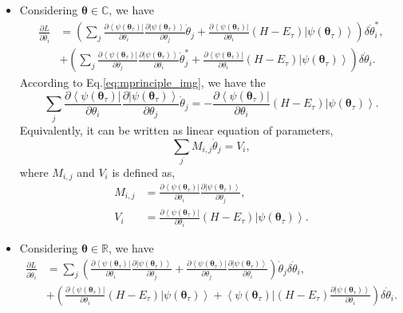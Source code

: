 \documentclass[twocolumn,
pra,aps,superscriptaddress,showpacs,amsmath,amssymb]{revtex4-2}
\begin{document}
\begin{itemize}
\item Considering $\bm{\theta}\in \mathbb{C}$, we have
\begin{align}
\frac{\partial{L}}{\partial\dot{\theta}_i}& =\left(\sum_j\frac{\partial\left<\psi(\bm{\theta}_\tau)\right|}{\partial\theta_i}\frac{\partial\left|\psi(\bm{\theta}_\tau)\right>}{\partial\theta_j}\dot{\theta}_j+\frac{\partial\left<\psi(\bm{\theta}_\tau)\right|}{\partial\theta_i}(H - E_\tau)\left|\psi(\bm{\theta}_\tau)\right>\right)\delta\dot{\theta}_i^*,  \\
&+\left(\sum_j\frac{\partial\left<\psi(\bm{\theta}_\tau)\right|}{\partial\theta_j}\frac{\partial\left|\psi(\bm{\theta}_\tau)\right>}{\partial\theta_i}\dot{\theta}_j^*+\frac{\partial\left<\psi(\bm{\theta}_\tau)\right|}{\partial\theta_i}(H - E_\tau)\left|\psi(\bm{\theta}_\tau)\right>\right)\delta\dot{\theta}_i.
\end{align}
According to Eq.\eqref{eq:mprinciple_img}, we have the 
\begin{equation}
\sum_j\frac{\partial\left<\psi(\bm{\theta}_\tau)\right|}{\partial\theta_i}\frac{\partial\left|\psi(\bm{\theta}_\tau)\right>}{\partial\theta_j}\dot{\theta}_j=-\frac{\partial\left<\psi(\bm{\theta}_\tau)\right|}{\partial\theta_i}(H - E_\tau)\left|\psi(\bm{\theta}_\tau)\right>.
\end{equation}
Equivalently, it can be written as linear equation of parameters,
\begin{equation}
\sum_jM_{i,j}\dot{\theta}_j = V_i,
\end{equation}
where $M_{i,j}$ and $V_i$ is defined as,
\begin{align}
\label{eq:Mr}
M_{i,j}& = \frac{\partial\left<\psi(\bm{\theta}_\tau)\right|}{\partial\theta_i}\frac{\partial\left|\psi(\boldsymbol{\theta}_\tau)\right>}{\partial\theta_j},\\
V_i &= \frac{\partial\left\langle\psi(\bm{\theta}_\tau)\right|}{\partial\theta_{i}}(H - E_\tau)\left|\psi(\bm{\theta}_\tau)\right\rangle.
\end{align}
\item Considering $\bm{\theta}\in \mathbb{R}$, we have
\begin{align}
\frac{\partial{L}}{\partial\dot{\theta}_i}& =\sum_j\left(\frac{\partial\left<\psi(\bm{\theta}_\tau)\right|}{\partial\theta_i}\frac{\partial\left|\psi(\bm{\theta}_\tau)\right>}{\partial\theta_j}+\frac{\partial\left<\psi(\bm{\theta}_\tau)\right|}{\partial\theta_j}\frac{\partial\left|\psi(\bm{\theta}_\tau)\right>}{\partial\theta_i}\right)\dot{\theta}_j\delta\dot{\theta}_i,  \\
&+\left(\frac{\partial\left<\psi(\bm{\theta}_\tau)\right|}{\partial\theta_i}(H - E_\tau)\left|\psi(\bm{\theta}_\tau)\right>+\left<\psi(\bm{\theta}_\tau)\right|(H - E_\tau)\frac{\partial\left|\psi(\bm{\theta}_\tau)\right>}{\partial\theta_i}\right)\delta\dot{\theta}_i.
\end{align}


\end{itemize}
\end{document}
